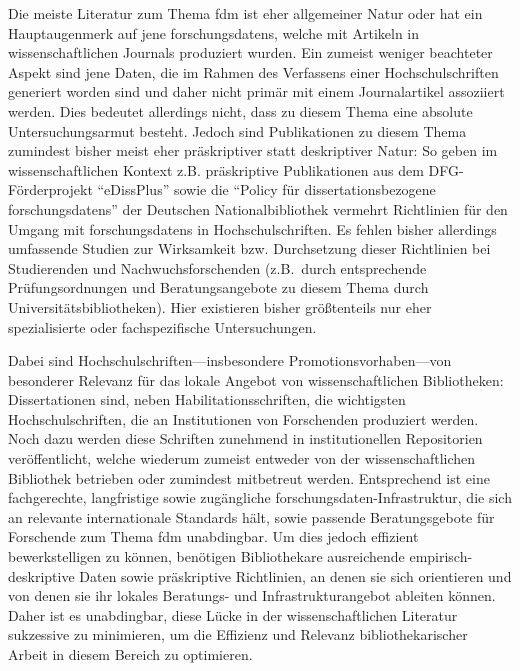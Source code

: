 Die meiste Literatur zum Thema \gls{fdm} ist eher allgemeiner Natur oder hat ein Hauptaugenmerk auf jene \glspl{forschungsdaten}, welche mit Artikeln in wissenschaftlichen Journals produziert wurden. Ein zumeist weniger beachteter Aspekt sind jene Daten, die im Rahmen des Verfassens einer Hochschulschriften generiert worden sind und daher nicht primär mit einem Journalartikel assoziiert werden.
Dies bedeutet allerdings nicht, dass zu diesem Thema eine absolute Untersuchungsarmut besteht.
Jedoch sind Publikationen zu diesem Thema zumindest bisher meist eher präskriptiver statt deskriptiver Natur:
So geben im wissenschaftlichen Kontext z.B. präskriptive Publikationen aus dem DFG-Förderprojekt \enquote{eDissPlus} \autocite{Weisbrod2017eDissPlus, KleinebergKaden2018, Weisbrod2018} sowie die \enquote{Policy für dissertationsbezogene \glspl{forschungsdaten}} der Deutschen Nationalbibliothek \autocite{dnb2017} vermehrt Richtlinien für den Umgang mit \glspl{forschungsdaten} in Hochschulschriften.
Es fehlen bisher allerdings umfassende Studien zur Wirksamkeit bzw.
Durchsetzung dieser Richtlinien bei Studierenden und Nachwuchsforschenden (z.B.~durch entsprechende Prüfungsordnungen und Beratungsangebote zu diesem Thema durch Universitätsbibliotheken).
Hier existieren bisher größtenteils nur eher spezialisierte oder fachspezifische Untersuchungen.

Dabei sind Hochschulschriften---insbesondere Promotionsvorhaben---von besonderer Relevanz für das lokale Angebot von wissenschaftlichen Bibliotheken:
Dissertationen sind, neben Habilitationsschriften, die wichtigsten Hochschulschriften, die an Institutionen von Forschenden produziert werden.
Noch dazu werden diese Schriften zunehmend in institutionellen Repositorien veröffentlicht, welche wiederum zumeist entweder von der wissenschaftlichen Bibliothek betrieben oder zumindest mitbetreut werden.
Entsprechend ist eine fachgerechte, langfristige sowie zugängliche \gls{forschungsdaten}-Infrastruktur, die sich an relevante internationale Standards hält, sowie passende Beratungsgebote für Forschende zum Thema \gls{fdm} unabdingbar.
Um dies jedoch effizient bewerkstelligen zu können, benötigen Bibliothekare ausreichende empirisch-deskriptive Daten sowie präskriptive Richtlinien, an denen sie sich orientieren und von denen sie ihr lokales Beratungs- und Infrastrukturangebot ableiten können.
Daher ist es unabdingbar, diese Lücke in der wissenschaftlichen Literatur sukzessive zu minimieren, um die Effizienz und Relevanz bibliothekarischer Arbeit in diesem Bereich zu optimieren.

